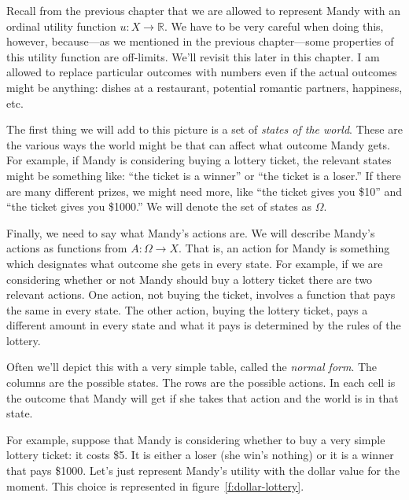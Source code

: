 Recall from the previous chapter that we are allowed to represent Mandy with an ordinal utility function $u: X \to \mathbb{R}$. We have to be very careful when doing this, however, because---as we mentioned in the previous chapter---some properties of this utility function are off-limits.  We'll revisit this later in this chapter. 
I am allowed to replace particular outcomes with numbers even if the actual outcomes might be anything: dishes at a restaurant, potential romantic partners, happiness, etc.

The first thing we will add to this picture is a set of {\it states of the world}. These are the various ways the world might be that can affect what outcome Mandy gets.  For example, if Mandy is considering buying a lottery ticket, the relevant states might be something like: ``the ticket is a winner'' or ``the ticket is a loser.''  If there are many different prizes, we might need more, like ``the ticket gives you \$10'' and ``the ticket gives you \$1000.''  We will denote the set of states as $\Omega$.  


Finally, we need to say what Mandy's actions are. We will describe Mandy's actions as functions from $A: \Omega \to X$.  That is, an action for Mandy is something which designates what outcome she gets in every state.  For example, if we are considering whether or not Mandy should buy a lottery ticket there are two relevant actions.  One action, not buying the ticket, involves a function that pays the same in every state.  The other action, buying the lottery ticket, pays a different amount in every state and what it pays is determined by the rules of the lottery.


Often we'll depict this with a very simple table, called the {\it normal form}.  The columns are the possible states.  The rows are the possible actions.  In each cell is the outcome that Mandy will get if she takes that action and the world is in that state. 

For example, suppose that Mandy is considering whether to buy a very simple lottery ticket: it costs \$5.  It is either a loser (she win's nothing) or it is a winner that pays \$1000.  Let's just represent Mandy's utility with the dollar value for the moment.  This choice is represented in figure~\ref{f:dollar-lottery}.

